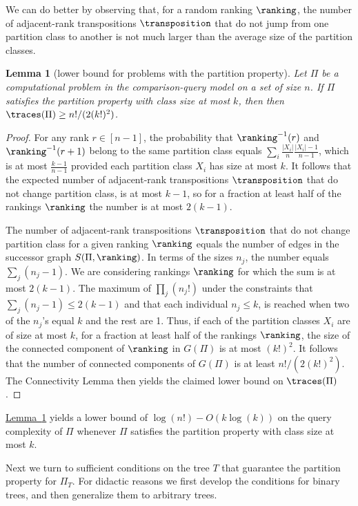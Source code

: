\documentclass[11pt]{article}
\numberwithin{equation}{section}
\newtheorem{lemma}[theorem]{Lemma}
\theoremstyle{definition}
\theoremstyle{plain}
\newcommand{\expref}[2]{\hyperref[#2]{#1~\ref{#2}}}
\begin{document}
We can do better by observing that, for a random ranking $\ranking$, the number of adjacent-rank transpositions $\transposition$ that do not jump from one partition class to another is not much larger than the average size of the partition classes.
\begin{lemma}[lower bound for problems with the partition property]\label{lemma:connectivity:sensitive}
Let $\Pi$ be a computational problem in the comparison-query model on a set of size $n$. If $\Pi$ satisfies the partition property with class size at most $k$, then then $\traces(\Pi) \ge n!/(2(k!)^2)$.
\end{lemma}
\begin{proof}
For any rank $r \in [n-1]$, the probability that $\ranking^{-1}(r)$ and $\ranking^{-1}(r+1)$ belong to the same partition class equals $\sum_i \frac{|X_i|}{n} \frac{|X_i|-1}{n-1}$, which is at most $\frac{k-1}{n-1}$ provided each partition class $X_i$ has size at most $k$. It follows that the expected number of adjacent-rank transpositions $\transposition$ that do not change partition class, is at most $k-1$, so for a fraction at least half of the rankings $\ranking$ the number is at most $2(k-1)$.

The number of adjacent-rank transpositions $\transposition$ that do not change partition class for a given ranking $\ranking$ equals the number of edges in the successor graph $S(\Pi,\ranking)$. In terms of the sizes $n_j$, the number equals $\sum_j (n_j-1)$. We are considering rankings $\ranking$ for which the sum is at most $2(k-1)$. The maximum of $\prod_j (n_j!)$ under the constraints that $\sum_j (n_j-1) \le 2(k-1)$ and that each individual $n_j \le k$, is reached when two of the $n_j$'s equal $k$ and the rest are 1. Thus, if each of the partition classes $X_i$ are of size at most $k$, for a fraction at least half of the rankings $\ranking$, the size of the connected component of $\ranking$ in $G(\Pi)$ is at most $(k!)^2$. It follows that the number of connected components of $G(\Pi)$ is at least $n!/(2(k!)^2)$. The Connectivity Lemma then yields the claimed lower bound on $\traces(\Pi)$.
\end{proof}

\expref{Lemma}{lemma:connectivity:sensitive} yields a lower bound of $\log(n!) - O(k \log(k))$ on the query complexity of $\Pi$ whenever $\Pi$ satisfies the partition property with class size at most $k$. 

Next we turn to sufficient conditions on the tree $T$ that guarantee the partition property for $\Pi_T$. For didactic reasons we first develop the conditions for binary trees, and then generalize them to arbitrary trees.
\end{document}
